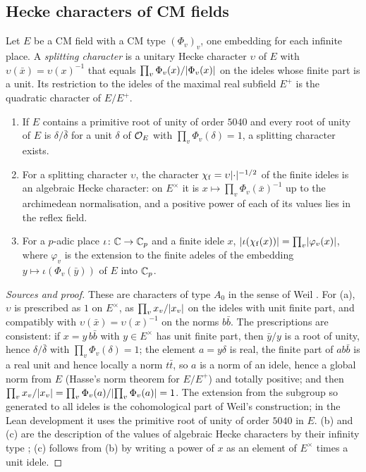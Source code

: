 \subsection{Hecke characters of CM fields}\label{ss:B-hecke}
Let $E$ be a CM field with a CM type $(\Phi_v)_{v}$, one embedding for each infinite place. A
\emph{splitting character} is a unitary Hecke character $\upsilon$ of $E$ with
$\upsilon(\bar x)=\upsilon(x)^{-1}$ that equals $\prod_v\Phi_v(x)/\lvert \Phi_v(x)\rvert$ on the ideles whose
finite part is a unit. Its restriction to the ideles of the maximal real subfield $E^+$ is the
quadratic character of $E/E^+$.

\begin{theorem}\label{thm:B-splitting-character}
\begin{enumerate}[label=\textup{(\alph*)}]
\item If $E$ contains a primitive root of unity of order $5040$ and every root of unity of $E$ is
$\delta/\bar\delta$ for a unit $\delta$ of $\mathcal{O}_E$ with $\prod_v\Phi_v(\delta)=1$, a splitting character
exists.
\item For a splitting character $\upsilon$, the character $\chi_{\mathrm f}=\upsilon\lvert \cdot\rvert^{-1/2}$ of the
finite ideles is an algebraic Hecke character: on $E^\times$ it is $x\mapsto\prod_v\Phi_v(\bar x)^{-1}$ up
to the archimedean normalisation, and a positive power of each of its values lies in the reflex
field.
\item For a $p$-adic place $\iota\colon\mathbb{C}\to\mathbb{C}_p$ and a finite idele $x$,
$\lvert \iota(\chi_{\mathrm f}(x))\rvert=\prod_v\lvert \varphi_v(x)\rvert$, where $\varphi_v$ is the extension to the finite
adeles of the embedding $y\mapsto\iota(\Phi_v(\bar y))$ of $E$ into $\mathbb{C}_p$.
\end{enumerate}
\end{theorem}

\begin{proof}[Sources and proof]
These are characters of type $A_0$ in the sense of Weil \cite{Weil1956}. For (a), $\upsilon$ is
prescribed as $1$ on $E^\times$, as $\prod_v x_v/\lvert x_v\rvert$ on the ideles with unit finite part, and
compatibly with $\upsilon(\bar x)=\upsilon(x)^{-1}$ on the norms $b\bar b$. The prescriptions are consistent:
if $x=y\,b\bar b$ with $y\in E^\times$ has unit finite part, then $\bar y/y$ is a root of unity,
hence $\delta/\bar\delta$ with $\prod_v\Phi_v(\delta)=1$; the element $a=y\delta$ is real, the finite part of
$ab\bar b$ is a real unit and hence locally a norm $t\bar t$, so $a$ is a norm of an idele, hence a
global norm from $E$ (Hasse's norm theorem for $E/E^+$) and totally positive; and then
$\prod_vx_v/\lvert x_v\rvert=\prod_v\Phi_v(a)/\lvert \prod_v\Phi_v(a)\rvert=1$. The extension from the subgroup so
generated to all ideles is the cohomological part of Weil's construction; in the Lean development it
uses the primitive root of unity of order $5040$ in $E$. (b) and (c) are the description of the
values of algebraic Hecke characters by their infinity type \cite{Weil1956}; (c) follows from (b) by
writing a power of $x$ as an element of $E^\times$ times a unit idele.
\end{proof}

